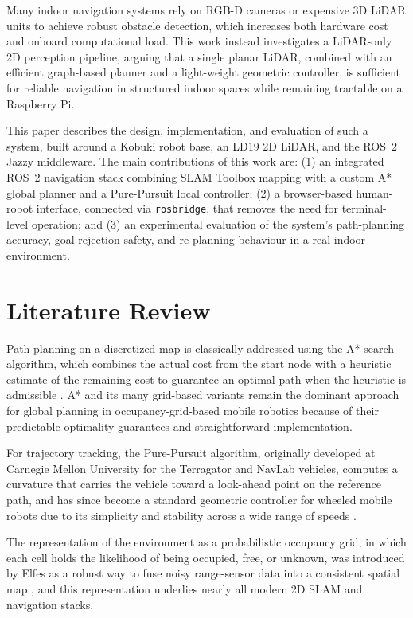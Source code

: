 \documentclass[10pt,twocolumn]{article}
\begin{document}
Many indoor navigation systems rely on RGB-D cameras or expensive 3D LiDAR units to achieve robust obstacle detection, which increases both hardware cost and onboard computational load. This work instead investigates a LiDAR-only 2D perception pipeline, arguing that a single planar LiDAR, combined with an efficient graph-based planner and a light-weight geometric controller, is sufficient for reliable navigation in structured indoor spaces while remaining tractable on a Raspberry Pi.

This paper describes the design, implementation, and evaluation of such a system, built around a Kobuki robot base, an LD19 2D LiDAR, and the ROS~2 Jazzy middleware. The main contributions of this work are: (1) an integrated ROS~2 navigation stack combining SLAM Toolbox mapping with a custom A* global planner and a Pure-Pursuit local controller; (2) a browser-based human-robot interface, connected via \texttt{rosbridge}, that removes the need for terminal-level operation; and (3) an experimental evaluation of the system's path-planning accuracy, goal-rejection safety, and re-planning behaviour in a real indoor environment.

\section{Literature Review}
Path planning on a discretized map is classically addressed using the A* search algorithm, which combines the actual cost from the start node with a heuristic estimate of the remaining cost to guarantee an optimal path when the heuristic is admissible \cite{hart1968}. A* and its many grid-based variants remain the dominant approach for global planning in occupancy-grid-based mobile robotics because of their predictable optimality guarantees and straightforward implementation.

For trajectory tracking, the Pure-Pursuit algorithm, originally developed at Carnegie Mellon University for the Terragator and NavLab vehicles, computes a curvature that carries the vehicle toward a look-ahead point on the reference path, and has since become a standard geometric controller for wheeled mobile robots due to its simplicity and stability across a wide range of speeds \cite{coulter1992}.

The representation of the environment as a probabilistic occupancy grid, in which each cell holds the likelihood of being occupied, free, or unknown, was introduced by Elfes as a robust way to fuse noisy range-sensor data into a consistent spatial map \cite{elfes1989}, and this representation underlies nearly all modern 2D SLAM and navigation stacks.
\end{document}
